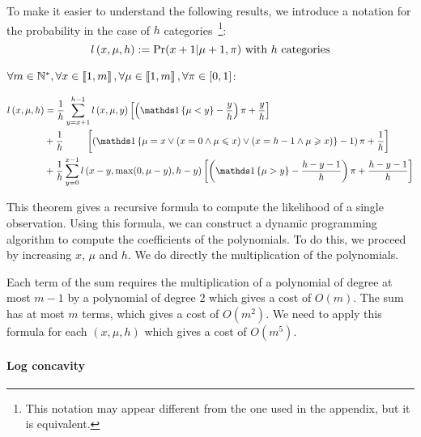 \begin{definition}
    To make it easier to understand the following results, we introduce a notation for the probability in the case of $h$ categories~\footnote{This notation may appear different from the one used in the appendix, but it is equivalent.}:
    \[ \mathnormal{l}\left(x, \mu, h\right) := \Pr(x + 1 | \mu + 1, \pi) \text{ with }h\text{ categories}\]
\end{definition}

\begin{thm}
    \label{thm:computing_likelihood_bos}
    $\forall m \in \mathbb{N}^*, \forall x \in \left\llbracket1, m\right\rrbracket, \forall \mu \in \left\llbracket1, m\right\rrbracket, \forall \pi \in [0, 1]$:

\begin{equation}
    \begin{aligned}
        \bosl{x}{\mu}{h}
        &=\frac{1}{h} \sum_{y = x + 1}^{h - 1} \bosl{x}{\mu}{y} \left[ \left( \indickronecker{\mu < y} - \frac{y}{h} \right) \pi + \frac{y}{h} \right] \\
            &+\frac{1}{h} \ \qquad \left[ \left( \indickronecker{\mu = x \lor (x = 0 \land \mu \leq x) \lor (x = h - 1 \land \mu \geq x)} - 1 \right) \pi +  \frac{1}{h} \right] \\
            &+\frac{1}{h} \sum_{y = 0}^{x - 1}\bosl{x - y}{\max(0, \mu - y)}{h - y}    \left[ \left( \indickronecker{\mu > y} - \frac{h - y - 1}{h} \right) \pi + \frac{h - y - 1}{h} \right]
    \end{aligned} \\
\end{equation}
\end{thm}

This theorem gives a recursive formula to compute the likelihood of a single observation. Using this formula, we can construct a dynamic programming algorithm to compute the coefficients of the polynomials. To do this, we proceed by increasing $x$, $\mu$ and $h$. We do directly the multiplication of the polynomials.

Each term of the sum requires the multiplication of a polynomial of degree at most $m - 1$ by a polynomial of degree $2$ which gives a cost of $O(m)$. The sum has at most $m$ terms, which gives a cost of $O(m^2)$. We need to apply this formula for each $(x, \mu, h)$ which gives a cost of $O(m^5)$.

\paragraph{Log concavity}

